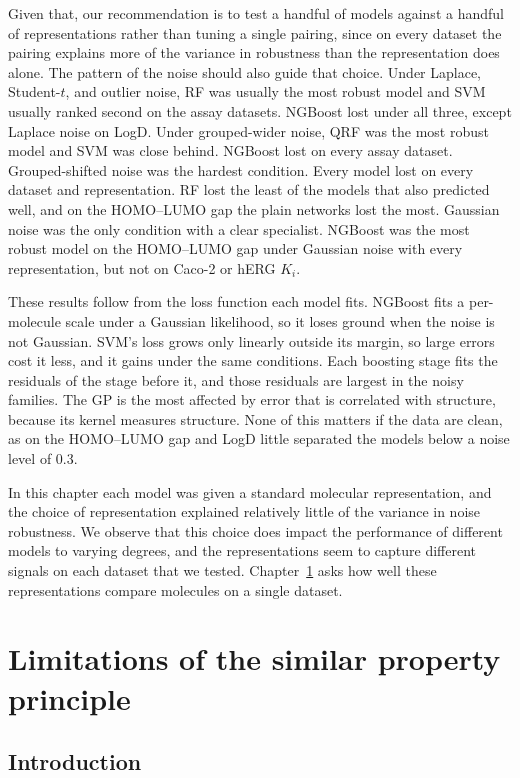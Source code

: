 Given that, our recommendation is to test a handful of models against a handful of representations rather than tuning a single pairing, since on every dataset the pairing explains more of the variance in robustness than the representation does alone. The pattern of the noise should also guide that choice. Under Laplace, Student-$t$, and outlier noise, RF was usually the most robust model and SVM usually ranked second on the assay datasets. NGBoost lost \aucnorm{} under all three, except Laplace noise on LogD. Under grouped-wider noise, QRF was the most robust model and SVM was close behind. NGBoost lost \aucnorm{} on every assay dataset. Grouped-shifted noise was the hardest condition. Every model lost \aucnorm{} on every dataset and representation. RF lost the least of the models that also predicted well, and on the HOMO--LUMO gap the plain networks lost the most. Gaussian noise was the only condition with a clear specialist. NGBoost was the most robust model on the HOMO--LUMO gap under Gaussian noise with every representation, but not on Caco-2 or hERG $K_i$.

These results follow from the loss function each model fits. NGBoost fits a per-molecule scale under a Gaussian likelihood, so it loses ground when the noise is not Gaussian. SVM's loss grows only linearly outside its margin, so large errors cost it less, and it gains under the same conditions. Each boosting stage fits the residuals of the stage before it, and those residuals are largest in the noisy families. The GP is the most affected by error that is correlated with structure, because its kernel measures structure. None of this matters if the data are clean, as on the HOMO--LUMO gap and LogD little separated the models below a noise level of 0.3.

In this chapter each model was given a standard molecular representation, and the choice of representation explained relatively little of the variance in noise robustness. We observe that this choice does impact the performance of different models to varying degrees, and the representations seem to capture different signals on each dataset that we tested. Chapter~\ref{chap:flaws} asks how well these representations compare molecules on a single dataset.

\chapter{Limitations of the similar property principle}\label{chap:flaws}

\section{Introduction}

